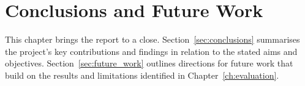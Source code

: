 
\chapter{Conclusions and Future Work}
\label{ch:con}

This chapter brings the report to a close. Section~\ref{sec:conclusions} 
summarises the project's key contributions and findings in relation to the 
stated aims and objectives. Section~\ref{sec:future_work} outlines directions 
for future work that build on the results and limitations identified in 
Chapter~\ref{ch:evaluation}.

